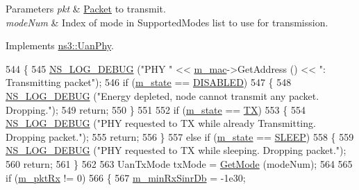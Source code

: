 \begin{DoxyParams}{Parameters}
{\em pkt} & \hyperlink{classns3_1_1Packet}{Packet} to transmit. \\
\hline
{\em mode\+Num} & Index of mode in Supported\+Modes list to use for transmission. \\
\hline
\end{DoxyParams}


Implements \hyperlink{classns3_1_1UanPhy_acf6edcd5eefae18a091b5d5a2344b9af}{ns3\+::\+Uan\+Phy}.


\begin{DoxyCode}
544 \{
545   \hyperlink{group__logging_ga413f1886406d49f59a6a0a89b77b4d0a}{NS\_LOG\_DEBUG} (\textcolor{stringliteral}{"PHY "} << \hyperlink{classns3_1_1UanPhyGen_a81c4906ead124f86017c0e7597d13c83}{m\_mac}->GetAddress () << \textcolor{stringliteral}{": Transmitting packet"});
546   \textcolor{keywordflow}{if} (\hyperlink{classns3_1_1UanPhyGen_a7c0bda9705a7f5f602707dde48497670}{m\_state} == \hyperlink{classns3_1_1UanPhy_afc5e3b6b00589131e4a56ececd42bf9faa9eccd74ad50233a8402ed255e273361}{DISABLED})
547     \{
548       \hyperlink{group__logging_ga413f1886406d49f59a6a0a89b77b4d0a}{NS\_LOG\_DEBUG} (\textcolor{stringliteral}{"Energy depleted, node cannot transmit any packet. Dropping."});
549       \textcolor{keywordflow}{return};
550     \}
551 
552   \textcolor{keywordflow}{if} (\hyperlink{classns3_1_1UanPhyGen_a7c0bda9705a7f5f602707dde48497670}{m\_state} == \hyperlink{classns3_1_1UanPhy_afc5e3b6b00589131e4a56ececd42bf9faab8bf12eabef757b7e77f59f71ff102c}{TX})
553     \{
554       \hyperlink{group__logging_ga413f1886406d49f59a6a0a89b77b4d0a}{NS\_LOG\_DEBUG} (\textcolor{stringliteral}{"PHY requested to TX while already Transmitting.  Dropping packet."});
555       \textcolor{keywordflow}{return};
556     \}
557   \textcolor{keywordflow}{else} \textcolor{keywordflow}{if} (\hyperlink{classns3_1_1UanPhyGen_a7c0bda9705a7f5f602707dde48497670}{m\_state} == \hyperlink{classns3_1_1UanPhy_afc5e3b6b00589131e4a56ececd42bf9fa4992fce9c378d8a56ef87ca363d9a417}{SLEEP})
558     \{
559       \hyperlink{group__logging_ga413f1886406d49f59a6a0a89b77b4d0a}{NS\_LOG\_DEBUG} (\textcolor{stringliteral}{"PHY requested to TX while sleeping.  Dropping packet."});
560       \textcolor{keywordflow}{return};
561     \}
562 
563   UanTxMode txMode = \hyperlink{classns3_1_1UanPhyGen_ac6f7632bf515cf20ce242d8138ae00b8}{GetMode} (modeNum);
564 
565   \textcolor{keywordflow}{if} (\hyperlink{classns3_1_1UanPhyGen_a62bb9d948402d5a6bf95b23ca8411b66}{m\_pktRx} != 0)
566     \{
567       \hyperlink{classns3_1_1UanPhyGen_aa44c213593b93a7d0052819240e54a69}{m\_minRxSinrDb} = -1e30;

\end{DoxyCode}
